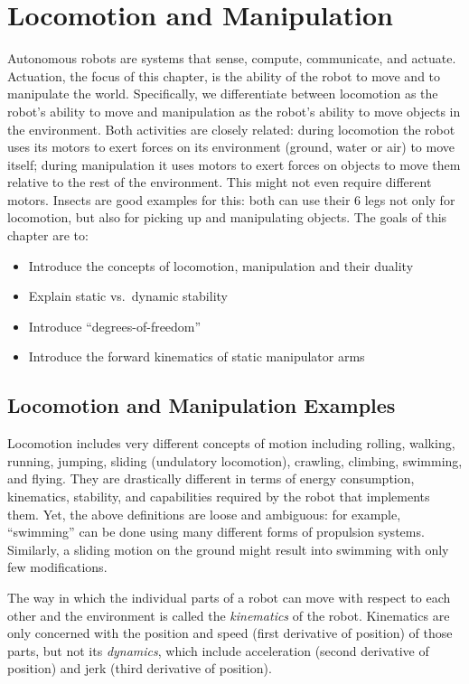 \chapter{Locomotion and Manipulation}\label{chap:locomotion}
Autonomous robots are systems that sense, compute, communicate, and actuate. Actuation, the focus of this chapter, is the ability of the robot to move and to manipulate the world. Specifically, we differentiate between locomotion as the robot's ability to move and manipulation as the robot's ability to move objects in the environment. Both activities are closely related: during locomotion the robot uses its motors to exert forces on its environment (ground, water or air) to move itself; during manipulation it uses motors to exert forces on objects to move them relative to the rest of the environment. This might not even require different motors. Insects are good examples for this: both can use their 6 legs not only for locomotion, but also for picking up and manipulating objects. The goals of this chapter are to:
\begin{itemize}
\item Introduce the concepts of locomotion, manipulation and their duality
\item Explain static vs.\ dynamic stability
\item Introduce ``degrees-of-freedom''
\item Introduce the forward kinematics of static manipulator arms
\end{itemize}

\section{Locomotion and Manipulation Examples}

Locomotion includes very different concepts of motion including rolling, walking, running, jumping, sliding (undulatory locomotion), crawling, climbing, swimming, and flying. They are drastically different in terms of energy consumption, kinematics, stability, and capabilities required by the robot that implements them. Yet, the above definitions are loose and ambiguous: for example, ``swimming'' can be done using many different forms of propulsion systems. Similarly, a sliding motion on the ground might result into swimming with only few modifications.

The way in which the individual parts of a robot can move with respect to each other and the environment is called the \emph{kinematics} of the robot. Kinematics are only concerned with the position and speed (first derivative of position) of those parts, but not its \emph{dynamics}, which include acceleration (second derivative of position) and jerk (third derivative of position).

